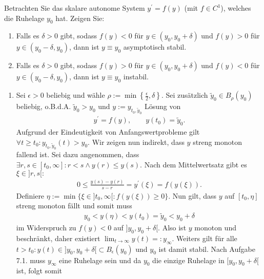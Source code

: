 \begin{exercise}
Betrachten Sie das skalare autonome System $y^{\prime} = f(y)$ (mit $f \in C^1$),
welches die Ruhelage $y_0$ hat. Zeigen Sie:
\begin{enumerate}[label = \textbf{\alph*)}]
  \item Falls es $\delta > 0$ gibt, sodass $f(y) < 0$ für $y \in (y_0,y_0 + \delta)$
und $f(y) > 0$ für $y \in (y_0 - \delta, y_0)$, dann ist $y \equiv y_0$
asymptotisch stabil.
\item Falls es $\delta > 0$ gibt, sodass $f(y) > 0$ für $y \in (y_0,y_0 + \delta)$
und $f(y) < 0$ für $y \in (y_0 - \delta, y_0)$, dann ist $y \equiv y_0$ instabil.
\end{enumerate}
\end{exercise}
\begin{solution}
  \phantom{}
\begin{enumerate}[label = \textbf{\alph*)}]
\item Sei $\epsilon > 0$ beliebig und wähle
$\rho := \min \left\{\frac{\epsilon}{2}, \delta \right\}$.
Sei zusätzlich $\widetilde{y}_0 \in B_{\rho}(y_0)$ beliebig, o.B.d.A. $\widetilde{y}_0 > y_0$
und $y := y_{t_0,\widetilde{y}_0}$ Lösung von
\begin{align*}
  y^{\prime} = f(y), \qquad y(t_0) = \widetilde{y}_0.
\end{align*}
Aufgrund der Eindeutigkeit von Anfangswertprobleme gilt
$\forall t \geq t_0: y_{t_0,\widetilde{y}_0}(t) > y_0$.
Wir zeigen nun indirekt, dass $y$ streng monoton fallend ist.
Sei dazu angenommen, dass $\exists r,s \in [t_0,\infty]: r < s \land y(r) \leq y(s)$.
Nach dem Mittelwertsatz gibt es $\xi \in ]r,s[:$
\begin{align*}
  0 \leq \frac{y(s)-y(r)}{s-r} = y^{\prime}(\xi) = f(y(\xi)).
\end{align*}
Definiere $\eta := \min \{\xi \in ]t_0,\infty[: f(y(\xi)) \geq 0 \}$.
Nun gilt, dass $y$ auf $[t_0, \eta]$ streng monoton fällt und somit muss
\begin{align*}
  y_0 < y(\eta) < y(t_0) = \widetilde{y}_0 < y_0 + \delta
\end{align*}
im Widerspruch zu $f(y) < 0$ auf $]y_0,y_0 + \delta[$.
Also ist $y$ monoton und beschränkt, daher existiert $\lim_{t \to \infty} y(t) =: y_{\infty}$.
Weiters gilt für alle $t > t_0: y(t) \in ]y_0, y_0 + \delta[ \subset B_{\epsilon}(y_0)$
und $y_0$ ist damit stabil.
Nach Aufgabe 7.1. muss $y_{\infty}$ eine Ruhelage sein und da $y_0$ die einzige
Ruhelage in $[y_0,y_0 + \delta[$ ist, folgt somit
\begin{align*}

\end{align*}
\end{enumerate}
\end{solution}
